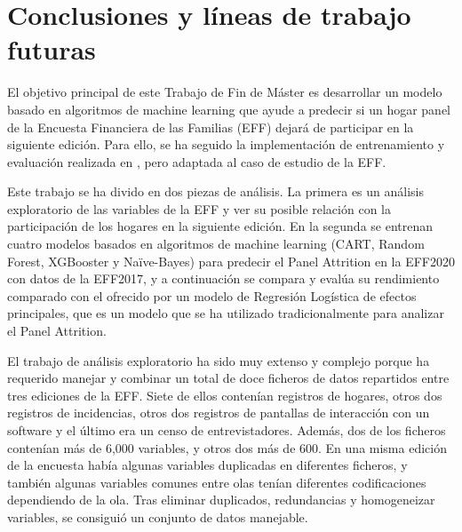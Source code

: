 \chapter{Conclusiones y líneas de trabajo futuras}
\label{chapter:conclusiones}

El objetivo principal de este Trabajo de Fin de Máster es desarrollar un modelo basado en algoritmos de machine learning que ayude a predecir si un hogar panel de la Encuesta Financiera de las Familias (EFF) dejará de participar en la siguiente edición. Para ello, se ha seguido la implementación de entrenamiento y evaluación realizada en \cite{beste2023case}, pero adaptada al caso de estudio de la EFF.

Este trabajo se ha divido en dos piezas de análisis. La primera es un análisis exploratorio de las variables de la EFF y ver su posible relación con la participación de los hogares en la siguiente edición. En la segunda se entrenan cuatro modelos basados en algoritmos de machine learning (CART, Random Forest, XGBooster y Naïve-Bayes) para predecir el Panel Attrition en la EFF2020 con datos de la EFF2017, y a continuación se compara y evalúa su rendimiento comparado con el ofrecido por un modelo de Regresión Logística de efectos principales, que es un modelo que se ha utilizado tradicionalmente para analizar el Panel Attrition.

El trabajo de análisis exploratorio ha sido muy extenso y complejo porque ha requerido manejar y combinar un total de doce ficheros de datos repartidos entre tres ediciones de la EFF. Siete de ellos contenían registros de hogares, otros dos registros de incidencias, otros dos registros de pantallas de interacción con un software y el último era un censo de entrevistadores. Además, dos de los ficheros contenían más de 6,000 variables, y otros dos más de 600. En una misma edición de la encuesta había algunas variables duplicadas en diferentes ficheros, y también algunas variables comunes entre olas tenían diferentes codificaciones dependiendo de la ola. Tras eliminar duplicados, redundancias y homogeneizar variables, se consiguió un conjunto de datos manejable.

